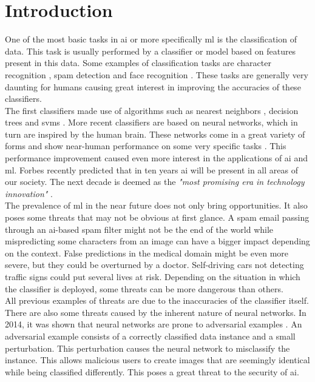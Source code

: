 \chapter{Introduction}
One of the most basic tasks in \gls{ai} or more specifically \gls{ml} is the classification of data. This task is usually performed by a classifier or model based on features present in this data. Some examples of classification tasks are character recognition \cite{mnist}, spam detection \cite{spambase} and face recognition \cite{face_recognition_survey}. These tasks are generally very daunting for humans causing great interest in improving the accuracies of these classifiers.\\

The first classifiers made use of algorithms such as nearest neighbors \cite{nearest_neighor}, decision trees \cite{decision_tree} and \glspl{svm} \cite{svm}. More recent classifiers are based on neural networks, which in turn are inspired by the human brain. These networks come in a great variety of forms and show near-human performance on some very specific tasks \cite{alpha_go_google}. This performance improvement caused even more interest in the applications of \gls{ai} and \gls{ml}. Forbes \cite{forbes} recently predicted that in ten years \gls{ai} will be present in all areas of our society. The next decade is deemed as the \textit{"most promising era in technology innovation"} \cite{forbes}.\\

The prevalence of \gls{ml} in the near future does not only bring opportunities. It also poses some threats that may not be obvious at first glance. A spam email passing through an \gls{ai}-based spam filter might not be the end of the world while mispredicting some characters from an image can have a bigger impact depending on the context. False predictions in the medical domain might be even more severe, but they could be overturned by a doctor. Self-driving cars not detecting traffic signs could put several lives at risk. Depending on the situation in which the classifier is deployed, some threats can be more dangerous than others.\\

All previous examples of threats are due to the inaccuracies of the classifier itself. There are also some threats caused by the inherent nature of neural networks. In 2014, it was shown that neural networks are prone to adversarial examples \cite{szegedy2014intriguing}. An adversarial example consists of a correctly classified data instance and a small perturbation. This perturbation causes the neural network to misclassify the instance. This allows malicious users to create images that are seemingly identical while being classified differently. This poses a great threat to the security of \gls{ai}.\\

